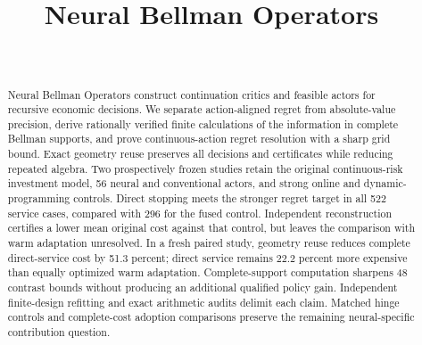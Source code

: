 \documentclass[ecta,nameyear,draft]{econsocart}
\begin{document}
\begin{frontmatter}
\title{Neural Bellman Operators}
\begin{aug}
\author[id=au1,addressref={add1}]{~}
\address[id=add1]{Peking University}
\end{aug}
\begin{abstract}
Neural Bellman Operators construct continuation critics and feasible actors
for recursive economic decisions. We separate action-aligned regret from
absolute-value precision, derive rationally verified finite calculations of
the information in complete Bellman supports, and prove continuous-action
regret resolution with a sharp grid bound. Exact geometry reuse preserves
all decisions and certificates while reducing repeated algebra. Two
prospectively frozen studies retain the original continuous-risk investment
model, 56 neural and conventional actors, and strong online and dynamic-programming
controls. Direct stopping meets the stronger regret target in all 522 service
cases, compared with 296 for the fused control. Independent reconstruction
certifies a lower mean original cost against that control, but leaves the
comparison with warm adaptation unresolved. In a fresh paired study,
geometry reuse reduces complete direct-service cost by 51.3 percent; direct
service remains 22.2 percent more expensive than equally optimized warm
adaptation. Complete-support computation sharpens 48 contrast bounds without
producing an additional qualified policy gain. Independent finite-design
refitting and exact arithmetic audits delimit each claim. Matched hinge
controls and complete-cost adoption comparisons preserve the remaining
neural-specific contribution question.
\end{abstract}
\begin{keyword}
\end{keyword}
\end{frontmatter}

















\begingroup
\let\NBOBibliographyStart\thebibliography
\renewcommand{\thebibliography}[1]{\NBOBibliographyStart{#1}\raggedright}

\endgroup
\end{document}
